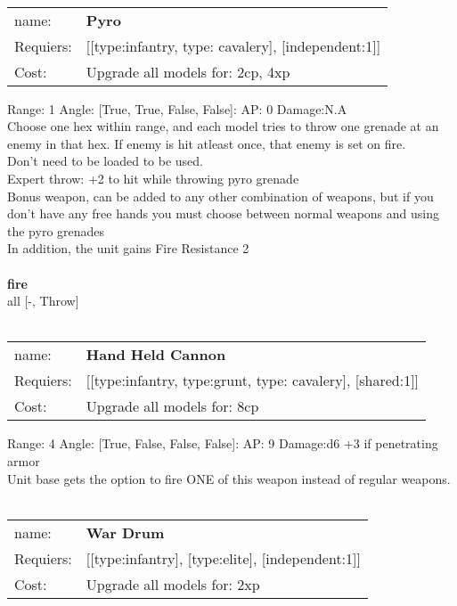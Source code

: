 \ \\
\begin{tabular}{ll}
name: & {\bf Pyro } \\
Requiers: & [[type:infantry, type: cavalery], [independent:1]] \\
Cost: & Upgrade all models for: 2cp, 4xp \\
\end{tabular}



Range: 1  Angle: [True, True, False, False]: AP: 0 Damage:N.A \\
Choose one hex within range, and each model tries to throw one grenade at an enemy in that hex. If enemy is hit atleast once, that enemy is set on fire.\\ 
Don't need to be loaded to be used.\\ 
Expert throw: +2 to hit while throwing pyro grenade\\ 
Bonus weapon, can be added to any other combination of weapons, but if you don't have any free hands you must choose between normal weapons and using the pyro grenades\\ 
In addition, the unit gains Fire Resistance 2\\ 







\ \\ {\bf fire } \\
all [-, Throw] \\

\ \\
\begin{tabular}{ll}
name: & {\bf Hand Held Cannon } \\
Requiers: & [[type:infantry, type:grunt, type: cavalery], [shared:1]] \\
Cost: & Upgrade all models for: 8cp \\
\end{tabular}



Range: 4  Angle: [True, False, False, False]: AP: 9 Damage:d6 +3 if penetrating armor \\
Unit base gets the option to fire ONE of this weapon instead of regular weapons.\\ 








\ \\
\begin{tabular}{ll}
name: & {\bf War Drum } \\
Requiers: & [[type:infantry], [type:elite], [independent:1]] \\
Cost: & Upgrade all models for: 2xp \\
\end{tabular}


